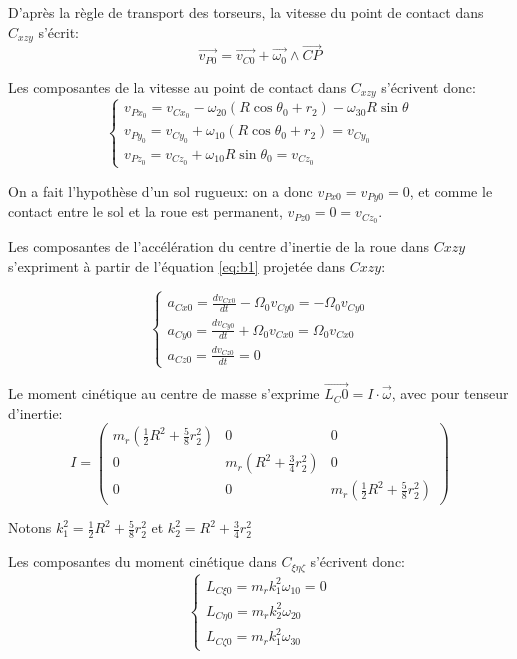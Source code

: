 D'après la règle de transport des torseurs, la vitesse du point de contact dans $C_{xzy}$ s'écrit:
\begin{equation}
    \vec{v_{P0}}=\vec{v_{C0}}+\vec{\omega_0} \wedge \vec{CP}
  \label{eq:b3}
\end{equation}

Les composantes de la vitesse au point de contact dans $C_{xzy}$ s'écrivent donc:
\begin{equation}
  \begin{cases}
    v_{Px_0}=v_{Cx_0}-\omega_{20} (R\cos{\theta_0}+r_2) -\omega_{30} R\sin{\theta} \\
    v_{Py_0}=v_{Cy_0} + \omega_{10} (R\cos{\theta_0}+r_2)= v_{Cy_0}\\
    v_{Pz_0}=v_{Cz_0} + \omega_{10} R\sin{\theta_0} = v_{Cz_0}
  \end{cases}
  \label{eq:b4}
\end{equation}

On a fait l'hypothèse d'un sol rugueux: on a donc $v_{Px0}=v_{Py0}=0$, et comme le contact entre le sol et la roue est permanent, $v_{Pz0}=0=v_{Cz_0}$.


Les composantes de l'accélération du centre d'inertie de la roue dans $C{xzy}$ s'expriment à partir de l'équation \ref{eq:b1} projetée dans $C{xzy}$:

\begin{equation}
  \begin{cases}
    a_{Cx0}=\frac{dv_{Cx0}}{dt}-\Omega_0 v_{Cy0}=-\Omega_0 v_{Cy0} \\
    a_{Cy0}=\frac{dv_{Cy0}}{dt} + \Omega_0 v_{Cx0}=\Omega_0 v_{Cx0}\\
    a_{Cz0}=\frac{dv_{Cz0}}{dt} = 0
  \end{cases}
  \label{eq:b5}
\end{equation}

Le moment cinétique au centre de masse s'exprime $\vec{L_C0}=I \cdot \vec{\omega}$, avec pour tenseur d'inertie:
$$
I=
\begin{pmatrix}
   m_r (\frac{1}{2}R^2+\frac{5}{8}r_2^2) & 0  &  0 \\
  0 &  m_r(R^2+\frac{3}{4}r_2^2) & 0 \\
  0 & 0 & m_r (\frac{1}{2}R^2+\frac{5}{8}r_2^2)
\end{pmatrix}
$$

Notons $k_1^2=\frac{1}{2}R^2+\frac{5}{8}r_2^2$ et $k_2^2=R^2+\frac{3}{4}r_2^2$

Les composantes du moment cinétique dans $C_{\xi \eta \zeta}$ s'écrivent donc:
\begin{equation}
  \begin{cases}
    L_{C\xi 0}=m_r k_1^2 \omega_{10}=0 \\
    L_{C\eta 0}=m_r k_2^2 \omega_{20}\\
    L_{C\zeta 0}=m_r k_1^2 \omega_{30}
  \end{cases}
  \label{eq:b6}
\end{equation}


